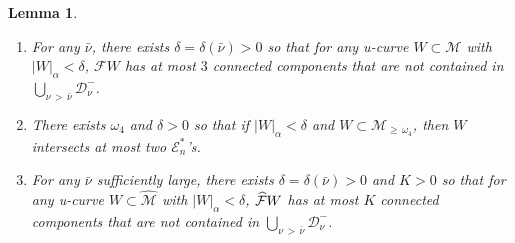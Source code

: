 \documentclass[10pt]{amsart}
\newtheorem{lemm}[theo]{Lemma}\newtheorem{prop}[theo]{Proposition}\newtheorem{coro}[theo]{Corollary}\newtheorem{conj}[theo]{Conjecture}
\theoremstyle{definition}\newtheorem{defi}[theo]{Definition}\newtheorem{rema}[theo]{Remark}\newtheorem{exam}[theo]{Example}\newtheorem{exem}[theo]{Example}\newtheorem{nota}[theo]{Notation}
\newcommand{\cEs}{\mathcal E^{*}}
\newcommand{\cm}{\mathcal{F}}
\newcommand{\cell}{\mathcal{D}}
\newcommand{\csp}{\mathcal{M}}
\newcommand{\cmp}{\hat\cm}
\newcommand{\cspl}[1]{\csp_{\ge\,#1}}
\newcommand{\cspi}{\widehat{\csp}}
\newcommand{\law}[1]{\omega_{#1}}
\newcommand{\adm}{_{\alpha^{+}}}
\newcommand{\indCell}{\nu}
\renewcommand{\adm}{_{\alpha}}
\newcommand*{\relabel}{\renewcommand{\labelenumi}{(\theenumi)}}
\newcommand*{\alphenumi}{\renewcommand*{\theenumi}{\alph{enumi}}\relabel}
\let\oldhat\hat
\renewcommand*{\hat}[1]{\mathchoice{\widehat{#1}}{\widehat{#1}}{\oldhat{#1}}{\oldhat{#1}}}
\begin{document}
\pagebreak
\begin{lemm}\label{l_largeCell}
\leavevmode
\begin{enumerate}\alphenumi
\item\label{i_almostFinite}
For any $\bar\indCell$, there exists $\delta =\delta(\bar\indCell) > 0$ so that for any u-curve $W\subset\csp$ with $|W|\adm < \delta$, $\cm W$ has at most $3$ connected components that are \emph{not} contained in $\bigcup_{\indCell\,>\,\bar\indCell}\cell^-_\indCell$.
\item\label{i_almostFinite-large}
There exists $\law4$ and $\delta > 0$ so that if $|W|\adm < \delta$ and $W\subset\cspl{\law4}$, then $W$ intersects at most two $\cEs_{n}$'s.
\item\label{i_almostFinite-induced}
For any $\bar\indCell$ sufficiently large, there exists $\delta =\delta(\bar\indCell) > 0$ and $K > 0$ so that for any u-curve $W\subset\cspi$ with $|W|\adm < \delta$, $\cmp W$ has at most $K$ connected components that are \emph{not} contained in $\bigcup_{\indCell\,>\,\bar\indCell}\cell^-_\indCell$.
\end{enumerate}
\end{lemm}
\end{document}
